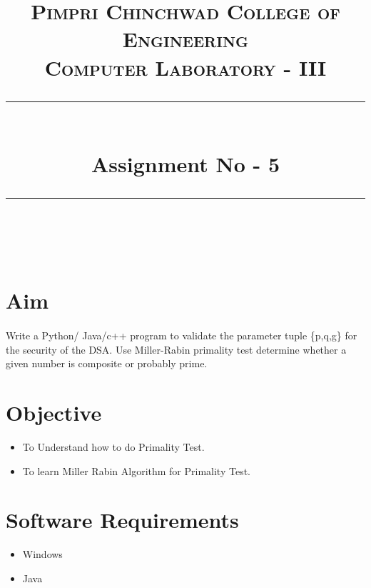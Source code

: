 \documentclass[a4paper,12pt]{article}
\title{
	\normalfont \normalsize 
	\textsc{Pimpri Chinchwad College of Engineering \\ 
		Computer Laboratory - III} \\
	[10pt] 
	\rule{\linewidth}{0.5pt} \\[6pt] 
	\huge Assignment No - 5 \\
	\rule{\linewidth}{2pt}  \\[10pt]
}
\author{}
\date{\normalsize}
\newenvironment{codeblock}{\fontfamily{pcr}\selectfont}{\par}
\begin{document}
\maketitle

\section{Aim}
	\paragraph{} Write a Python/ Java/c++ program to validate the parameter tuple \{p,q,g\} for the security of the DSA. Use Miller-Rabin primality test determine whether a given number is composite or probably prime.
	
\section{Objective}
	\begin{itemize}
	\item To Understand how to do Primality Test.
	\item To learn Miller Rabin Algorithm for Primality Test.
	\end{itemize}
	
\section{Software Requirements}
	\begin{itemize}
		\item	Windows
		\item	Java
	\end{itemize}
	
\end{document}
